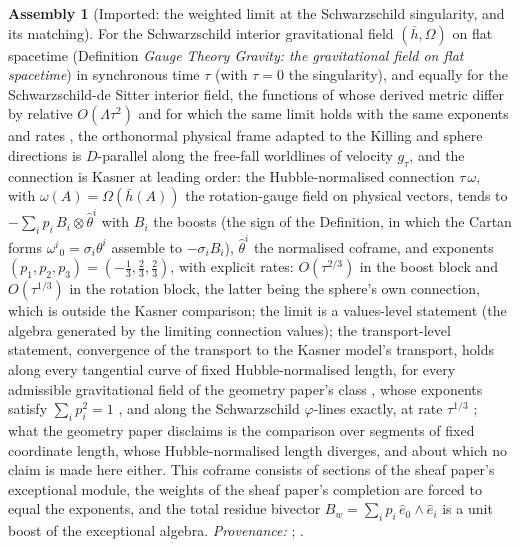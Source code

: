 \documentclass[11pt]{article}
\theoremstyle{definition}
\newtheorem{assembled}[theorem]{Assembly}
\theoremstyle{plain}
\newcommand{\changedmark}[2]{\marginpar{\raggedright\scriptsize\color{#1}#2}}
\providecommand{\hb}{}\renewcommand{\hb}{\bar{h}}
\begin{document}
\begin{assembled}[Imported: the weighted limit at the Schwarzschild singularity, and its matching]\label{c:dark-energy.imported-weighted-limit-schwarzschild-singularity-matching}
\changedmark{BurntOrange}{changed since the deposit}
For the Schwarzschild interior gravitational field $(\hb, \Omega)$ on flat spacetime (Definition \emph{Gauge Theory Gravity: the gravitational field on flat spacetime}) in synchronous time $\tau$ (with $\tau = 0$ the singularity), and equally for the Schwarzschild-de Sitter interior field, the functions of whose derived metric differ by relative $O(\Lambda\tau^2)$ and for which the same limit holds with the same exponents and rates \cite[Thm.~5.9]{ButlerT6}, the orthonormal physical frame adapted to the Killing and sphere directions is $D$-parallel along the free-fall worldlines of velocity $g_\tau$, and the connection is Kasner at leading order: the Hubble-normalised connection $\tau\,\omega$, with $\omega(A) = \Omega(\hb(A))$ the rotation-gauge field on physical vectors, tends to $-\sum_i p_i\, B_i \otimes \hat\theta^i$ with $B_i$ the boosts (the sign of the Definition, in which the Cartan forms $\omega^i{}_0 = \sigma_i\theta^i$ assemble to $-\sigma_i B_i$), $\hat\theta^i$ the normalised coframe, and exponents $(p_1, p_2, p_3) = (-\tfrac13, \tfrac23, \tfrac23)$, with explicit rates: $O(\tau^{2/3})$ in the boost block and $O(\tau^{1/3})$ in the rotation block, the latter being the sphere's own connection, which is outside the Kasner comparison; the limit is a values-level statement (the algebra generated by the limiting connection values); the transport-level statement, convergence of the transport to the Kasner model's transport, holds along every tangential curve of fixed Hubble-normalised length, for every admissible gravitational field of the geometry paper's class \cite[Def.~5.5]{ButlerT6}, whose exponents satisfy $\sum_i p_i^2 = 1$ \cite[Thm.~5.11]{ButlerT6}, and along the Schwarzschild $\varphi$-lines exactly, at rate $\tau^{1/3}$ \cite[Cor.~5.12]{ButlerT6}; what the geometry paper disclaims is the comparison over segments of fixed coordinate length, whose Hubble-normalised length diverges, and about which no claim is made here either. This coframe consists of sections of the sheaf paper's exceptional module, the weights of the sheaf paper's completion are forced to equal the exponents, and the total residue bivector $B_w = \sum_i p_i\, \hat e_0\wedge\hat e_i$ is a unit boost of the exceptional algebra. \emph{Provenance:} \cite[Lems.~5.1-5.4, Def.~5.5, Thm.~5.6, Thm.~5.9, Thm.~5.11, Cor.~5.12]{ButlerT6}; \cite[Thm.~8.16, Prop.~8.26, Thm.~8.27]{ButlerT4}.
\end{assembled}
\end{document}
